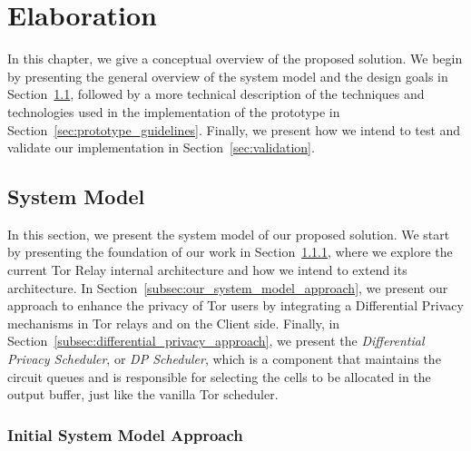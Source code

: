 
%

\makeatletter
\newcommand{\ntifpkgloaded}{%
  \@ifpackageloaded%
}
\makeatother


\chapter{Elaboration}\label{cha:elaboration}

In this chapter, we give a conceptual overview of the proposed solution. We begin by presenting the general overview of the system model and the design goals in Section~\ref{sec:system_model}, followed by a more technical description of the techniques and technologies used in the implementation of the prototype in Section~\ref{sec:prototype_guidelines}. Finally, we present how we intend to test and validate our implementation in Section~\ref{sec:validation}.

\section{System Model}\label{sec:system_model}

In this section, we present the system model of our proposed solution. We start by presenting the foundation of our work in Section~\ref{subsec:initial_system_model_approach}, where we explore the current Tor Relay internal architecture and how we intend to extend its architecture. In Section~\ref{subsec:our_system_model_approach}, we present our approach to enhance the privacy of Tor users by integrating a Differential Privacy mechanisms in Tor relays and on the Client side. Finally, in Section~\ref{subsec:differential_privacy_approach}, we present the \textit{Differential Privacy Scheduler}, or \textit{DP Scheduler}, which is a component that maintains the circuit queues and is responsible for selecting the cells to be allocated in the output buffer, just like the vanilla Tor scheduler.

\subsection{Initial System Model Approach}\label{subsec:initial_system_model_approach}

